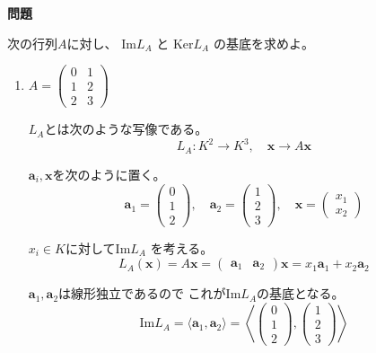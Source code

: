 \documentclass[12pt,b5paper]{ltjsarticle}
\begin{document}
\hrulefill
\textbf{問題}
\hrulefill

次の行列$A$に対し、
$\mathrm{Im}L_A$
と
$\mathrm{Ker}L_A$
の基底を求めよ。

\dotfill


\begin{enumerate}
 \item
      $A=\begin{pmatrix} 0 & 1 \\ 1 & 2 \\ 2 & 3 \end{pmatrix}$

      \dotfill

      $L_A$とは次のような写像である。
      \begin{equation}
       L_A : K^2 \to K^3 ,\quad \bm{x} \to A\bm{x}
      \end{equation}

      $\bm{a}_i,\bm{x}$を次のように置く。
      \begin{equation}
       \bm{a}_1=\begin{pmatrix} 0 \\ 1 \\ 2 \end{pmatrix}
       ,\quad
       \bm{a}_2=\begin{pmatrix} 1 \\ 2 \\ 3 \end{pmatrix}
       ,\quad
       \bm{x}=\begin{pmatrix} x_1 \\ x_2 \end{pmatrix}
      \end{equation}

      $x_i\in K$に対して$\mathrm{Im} L_A$
      を考える。
      \begin{equation}
       L_A(\bm{x})=A\bm{x}
        =\begin{pmatrix}
          \bm{a}_1&\bm{a}_2
         \end{pmatrix}\bm{x}
         = x_1\bm{a}_1 + x_2\bm{a}_2
         \label{form}
      \end{equation}

      $\bm{a}_1,\bm{a}_2$は線形独立であるので
      これが$\mathrm{Im}L_A$の基底となる。
      \begin{equation}
       \mathrm{Im}L_A
        = \langle \bm{a}_1,\bm{a}_2 \rangle
        =\left\langle
          \begin{pmatrix} 0 \\ 1 \\ 2 \end{pmatrix}
          ,
          \begin{pmatrix} 1 \\ 2 \\ 3 \end{pmatrix}
         \right\rangle
      \end{equation}


\end{enumerate}
\end{document}
